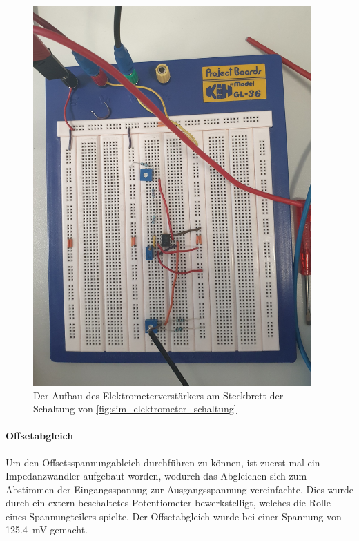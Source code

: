 \documentclass[12pt,english,ngerman]{scrartcl}
\begin{document}
\begin{figure}[H]
  \centering
    \includegraphics[width=0.95\textwidth]{./figures/elektrometer/steckbrett.png}
  \caption{Der Aufbau des Elektrometerverstärkers am Steckbrett der Schaltung von
  \autoref{fig:sim_elektrometer_schaltung}}
  \label{fig:ver_elektromete_aufbau}
\end{figure}

\paragraph{Offsetabgleich}\label{sec:offsetabgleich}
Um den Offsetsspannungableich durchführen zu können, ist zuerst mal ein
Impedanzwandler aufgebaut worden, wodurch das Abgleichen sich zum Abstimmen
der Eingangsspannug zur Ausgangsspannung vereinfachte. Dies wurde durch ein
extern beschaltetes Potentiometer bewerkstelligt, welches die Rolle eines
Spannungteilers spielte. Der Offsetabgleich wurde bei einer Spannung von
\SI{125.4}{\milli\volt} gemacht.
\end{document}
